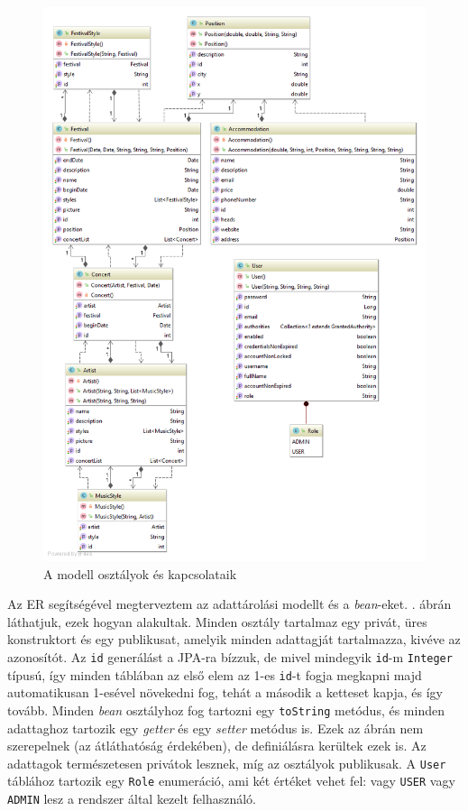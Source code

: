 
\begin{figure}
\centering
\includegraphics[scale=0.56]{kepek/uml.png}
\caption{A modell osztályok és kapcsolataik}
\label{fig:umlclass}
\end{figure}

Az ER segítségével megterveztem az adattárolási modellt és a \textit{bean}-eket. . ábrán láthatjuk, ezek hogyan alakultak. Minden osztály tartalmaz egy privát, üres konstruktort és egy publikusat, amelyik minden adattagját tartalmazza, kivéve az azonosítót. Az \texttt{id} generálást a JPA-ra bízzuk, de mivel mindegyik \texttt{id}-m \texttt{Integer} típusú, így minden táblában az első elem az 1-es \texttt{id}-t fogja megkapni majd automatikusan 1-esével növekedni fog, tehát a második a ketteset kapja, és így tovább. Minden \textit{bean} osztályhoz fog tartozni egy \texttt{toString} metódus, és minden adattaghoz tartozik egy \textit{getter} és egy \textit{setter} metódus is. Ezek az ábrán nem szerepelnek (az átláthatóság érdekében), de definiálásra kerültek ezek is. Az adattagok természetesen privátok lesznek, míg az osztályok publikusak. A \texttt{User} táblához tartozik egy \texttt{Role} enumeráció, ami két értéket vehet fel: vagy \texttt{USER} vagy \texttt{ADMIN} lesz a rendszer által kezelt felhasználó.

